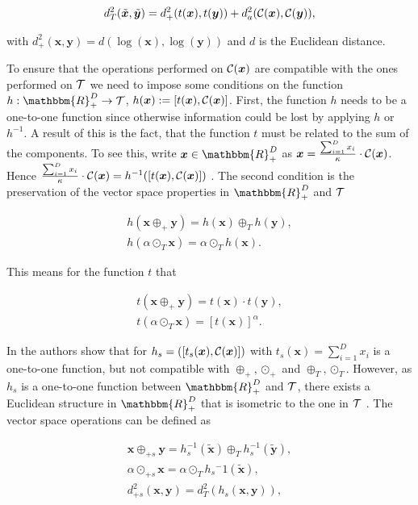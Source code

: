 \begin{gather}
d_T^2(\tilde{\bm{x}},\tilde{\bm{y}}) = d_+^2(t(\bm{x}),t(\bm{y})) + d_a^2(\mathcal{C}(\bm{x}),\mathcal{C}(\bm{y})),
\label{eq:distance Tspace}
\end{gather}

with $d_+^2(\bm{x},\bm{y}) = d(\log(\bm{x}),\log(\bm{y}))$ and $d$ is the Euclidean distance. 

To ensure that the operations performed on $\mathcal{C}(\bm{x})$ are compatible with the ones performed on $\mathcal{T}$ we need to impose some conditions on the function $h:\mathbbm{R}_+^D \rightarrow \Tsp$, $h(\bm{x}):=[t(\bm{x}),\mathcal{C}(\bm{x})]$. First, the function $h$ needs to be a one-to-one function since otherwise information could be lost by applying $h$ or $h^{-1}$. A result of this is the fact, that the function $t$ must be related to the sum of the components. To see this, write $\bm{x} \in \mathbbm{R}_+^D$ as $\bm{x} = \frac{\sum_{i=1}^D x_i}{\kappa} \cdot \mathcal{C}(\bm{x})$. Hence $ \frac{\sum_{i=1}^D x_i}{\kappa} \cdot \mathcal{C}(\bm{x}) = h^{-1}([t(\bm{x}),\mathcal{C}(\bm{x})])$ \cite{Pawlowsky:2013}.
The second condition is the preservation of the vector space properties in $\mathbbm{R}_+^D$ and $\mathcal{T}$

\begin{gather}
h(\bm{x} \oplus_+ \bm{y}) = h(\bm{x}) \oplus_T h(\bm{y}), \\
h(\alpha \odot_T \bm{x}) = \alpha \odot_T h(\bm{x}). 
\label{eq:Vector Space Properties}
\end{gather}

This means for the function $t$ that 

\begin{gather}
t(\bm{x} \oplus_+ \bm{y}) = t(\bm{x}) \cdot t(\bm{y}), \\
t(\alpha \odot_T \bm{x}) = [t(\bm{x})]^{\alpha}. 
\label{eq:Vector Space Properties for t}
\end{gather}

In \cite{Pawlowsky:2013} the authors show that for $h_s=([t_s(\bm{x}),\mathcal{C}(\bm{x})])$ with $t_s(\bm{x}) = \sum_{i=1}^D x_i$ is a one-to-one function, but not compatible with $\oplus_+,\odot_+$ and $\oplus_T,\odot_T$. However, as $h_s$ is a one-to-one function between $\mathbbm{R}_+^D$ and $\mathcal{T}$, there exists a Euclidean structure in $\mathbbm{R}_+^D$ that is isometric to the one in $\mathcal{T}$ \cite{Pawlowsky:2013}. The vector space operations can be defined as

\begin{gather}
\bm{x} \oplus_{+s} \bm{y} = h_s^{-1}(\tilde{\bm{x}}) \oplus_T  h_s^{-1}(\tilde{\bm{y}}), \\
\alpha \odot_{+s} \bm{x} = \alpha \odot_T h_s{^-1}(\tilde{\bm{x}}), \\
d_{+s}^2(\bm{x},\bm{y}) = d_T^2(h_s(\bm{x},\bm{y})),
\label{eq:Vector Space Operations sum}
\end{gather}

